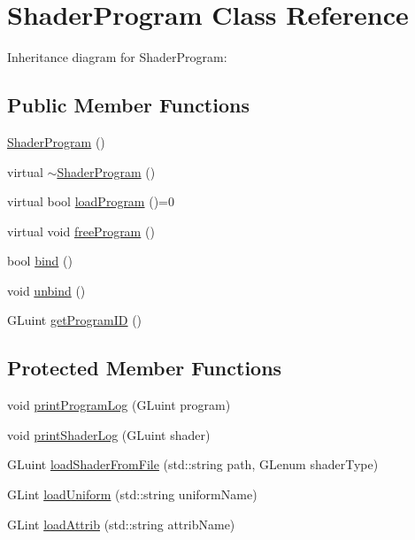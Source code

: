 \hypertarget{class_shader_program}{}\section{Shader\+Program Class Reference}
\label{class_shader_program}


Inheritance diagram for Shader\+Program\+:
\subsection*{Public Member Functions}
\begin{DoxyCompactItemize}
\item 
\hyperlink{class_shader_program_add585b75cb78f4afa865ea7b27c9651e}{Shader\+Program} ()
\item 
virtual \hyperlink{class_shader_program_a2d2eadcfc48cc2e2ddb82aba70553a9f}{$\sim$\+Shader\+Program} ()
\item 
virtual bool \hyperlink{class_shader_program_a77a03970497041319d7e996c92f59655}{load\+Program} ()=0
\item 
virtual void \hyperlink{class_shader_program_a4000b2c389106aba33d9bf08cc1b5b1a}{free\+Program} ()
\item 
bool \hyperlink{class_shader_program_a5d29230086616d9f0221c25bdc3f5b8d}{bind} ()
\item 
void \hyperlink{class_shader_program_aeb6df1f103db0e67efbb37ab31983e7f}{unbind} ()
\item 
G\+Luint \hyperlink{class_shader_program_a4bc838439dd995dfd7aafd337fa28995}{get\+Program\+I\+D} ()
\end{DoxyCompactItemize}
\subsection*{Protected Member Functions}
\begin{DoxyCompactItemize}
\item 
void \hyperlink{class_shader_program_a4ccdc87e3241168949491117b687ee71}{print\+Program\+Log} (G\+Luint program)
\item 
void \hyperlink{class_shader_program_a5bf4c2d263d0419835da1f66a12a5a00}{print\+Shader\+Log} (G\+Luint shader)
\item 
G\+Luint \hyperlink{class_shader_program_a7a25067fece6965c039432cf86e49446}{load\+Shader\+From\+File} (std\+::string path, G\+Lenum shader\+Type)
\item 
G\+Lint \hyperlink{class_shader_program_ae88ae348f010452392ed77dfb0310c3a}{load\+Uniform} (std\+::string uniform\+Name)
\item 
G\+Lint \hyperlink{class_shader_program_adeb74e1846d0aee5f24c661c18062634}{load\+Attrib} (std\+::string attrib\+Name)
\end{DoxyCompactItemize}
